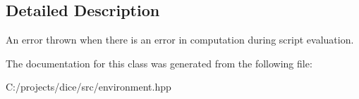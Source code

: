 \subsection{Detailed Description}
An error thrown when there is an error in computation during script evaluation. 

The documentation for this class was generated from the following file\+:\begin{DoxyCompactItemize}
\item 
C\+:/projects/dice/src/environment.\+hpp\end{DoxyCompactItemize}
